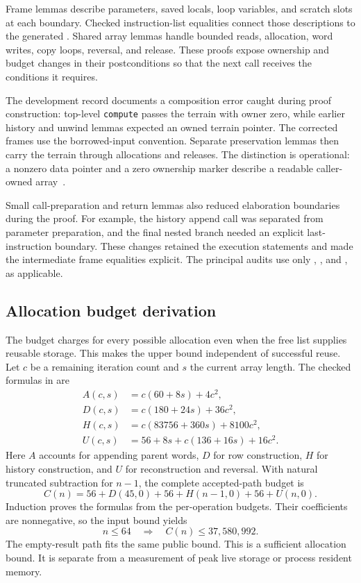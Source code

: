 \documentclass[11pt]{article}
\begin{document}
Frame lemmas describe parameters, saved locals, loop variables, and scratch slots at each boundary.  Checked instruction-list equalities connect those descriptions to the generated .  Shared array lemmas handle bounded reads, allocation, word writes, copy loops, reversal, and release.  These proofs expose ownership and budget changes in their postconditions so that the next call receives the conditions it requires.

The development record documents a composition error caught during proof construction: top-level \textup{\texttt{compute}} passes the terrain with owner zero, while earlier history and unwind lemmas expected an owned terrain pointer.  The corrected frames use the borrowed-input convention.  Separate preservation lemmas then carry the terrain through allocations and releases.  The distinction is operational: a nonzero data pointer and a zero ownership marker describe a readable caller-owned array~\cite{drone-record}.

Small call-preparation and return lemmas also reduced elaboration boundaries during the proof.  For example, the history append call was separated from parameter preparation, and the final nested branch needed an explicit last-instruction boundary.  These changes retained the execution statements and made the intermediate frame equalities explicit.  The principal audits use only , , and , as applicable.

\subsection{Allocation budget derivation}

The budget charges for every possible allocation even when the free list supplies reusable storage.  This makes the upper bound independent of successful reuse.  Let $c$ be a remaining iteration count and $s$ the current array length.  The checked formulas in  are
\begin{align*}
 A(c,s)&=c(60+8s)+4c^2,\\
 D(c,s)&=c(180+24s)+36c^2,\\
 H(c,s)&=c(83756+360s)+8100c^2,\\
 U(c,s)&=56+8s+c(136+16s)+16c^2.
\end{align*}
Here $A$ accounts for appending parent words, $D$ for row construction, $H$ for history construction, and $U$ for reconstruction and reversal.  With natural truncated subtraction for $n-1$, the complete accepted-path budget is
\[
 C(n)=56+D(45,0)+56+H(n-1,0)+56+U(n,0).
\]
Induction proves the formulas from the per-operation budgets.  Their coefficients are nonnegative, so the input bound yields
\[
 n\leq64\quad\Longrightarrow\quad C(n)\leq37{,}580{,}992.
\]
The empty-result path fits the same public bound.  This is a sufficient allocation bound.  It is separate from a measurement of peak live storage or process resident memory.
\end{document}
